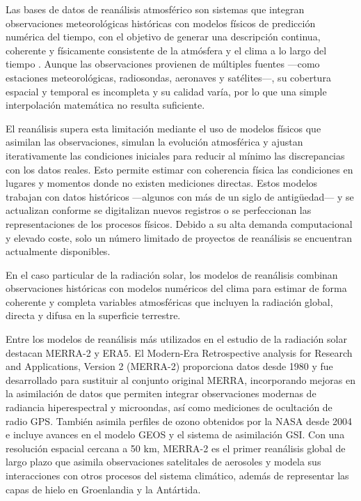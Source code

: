Las bases de datos de reanálisis atmosférico son sistemas que integran observaciones meteorológicas históricas con modelos físicos de predicción numérica del tiempo, con el objetivo de generar una descripción continua, coherente y físicamente consistente de la atmósfera y el clima a lo largo del tiempo \cite{Thejll2015}. Aunque las observaciones provienen de múltiples fuentes —como estaciones meteorológicas, radiosondas, aeronaves y satélites—, su cobertura espacial y temporal es incompleta y su calidad varía, por lo que una simple interpolación matemática no resulta suficiente.

El reanálisis supera esta limitación mediante el uso de modelos físicos que asimilan las observaciones, simulan la evolución atmosférica y ajustan iterativamente las condiciones iniciales para reducir al mínimo las discrepancias con los datos reales. Esto permite estimar con coherencia física las condiciones en lugares y momentos donde no existen mediciones directas. Estos modelos trabajan con datos históricos —algunos con más de un siglo de antigüedad— y se actualizan conforme se digitalizan nuevos registros o se perfeccionan las representaciones de los procesos físicos. Debido a su alta demanda computacional y elevado coste, solo un número limitado de proyectos de reanálisis se encuentran actualmente disponibles.

En el caso particular de la radiación solar, los modelos de reanálisis combinan observaciones históricas con modelos numéricos del clima para estimar de forma coherente y completa variables atmosféricas que incluyen la radiación global, directa y difusa en la superficie terrestre.

Entre los modelos de reanálisis más utilizados en el estudio de la radiación solar destacan MERRA-2 y ERA5. El Modern-Era Retrospective analysis for Research and Applications, Version 2 (MERRA-2) proporciona datos desde 1980 y fue desarrollado para sustituir al conjunto original MERRA, incorporando mejoras en la asimilación de datos que permiten integrar observaciones modernas de radiancia hiperespectral y microondas, así como mediciones de ocultación de radio GPS. También asimila perfiles de ozono obtenidos por la NASA desde 2004 e incluye avances en el modelo GEOS y el sistema de asimilación GSI. Con una resolución espacial cercana a 50 km, MERRA-2 es el primer reanálisis global de largo plazo que asimila observaciones satelitales de aerosoles y modela sus interacciones con otros procesos del sistema climático, además de representar las capas de hielo en Groenlandia y la Antártida.

